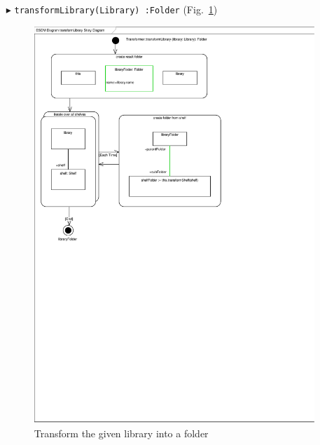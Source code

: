 \begin{enumerate}
\item[$\blacktriangleright$] \texttt{transformLibrary(Library)~:Folder}
  (Fig.~\ref{fig:moca-transformLibrary})    
\begin{figure}[!htbp]
\begin{center}
 \includegraphics[width=\textwidth]{pics/moca/4ModelToMocaTree/transformLibrary}
  \caption{Transform the given library into a folder} 
  \label{fig:moca-transformLibrary}
\end{center}
\end{figure}
  

\end{enumerate}
